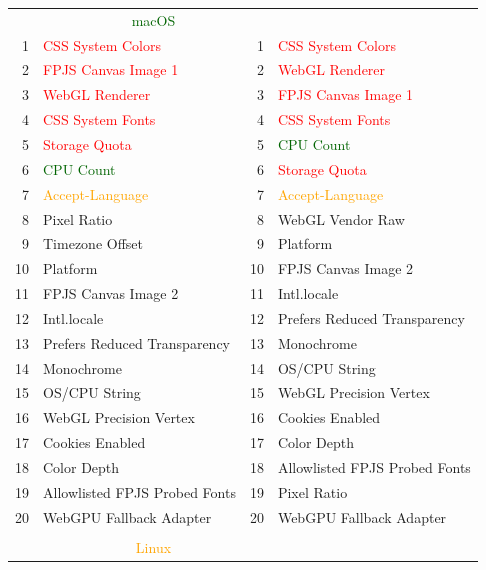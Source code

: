 \begin{table}[H]
\scriptsize
\centering
\begin{tabular}{r l | r l}
\Xhline{2\arrayrulewidth}
\multicolumn{2}{c|}{\textsf{\textcolor{red}{Windows}}} & \multicolumn{2}{c}{\textsf{\textcolor{darkgreen}{macOS}}} \\
\Xhline{2\arrayrulewidth}
1 & \textcolor{red}{CSS System Colors} & 1 & \textcolor{red}{CSS System Colors} \\
2 & \textcolor{red}{FPJS Canvas Image 1} & 2 & \textcolor{red}{WebGL Renderer} \\
3 & \textcolor{red}{WebGL Renderer} & 3 & \textcolor{red}{FPJS Canvas Image 1} \\
4 & \textcolor{red}{CSS System Fonts} & 4 & \textcolor{red}{CSS System Fonts} \\
5 & \textcolor{red}{Storage Quota} & 5 & \textcolor{darkgreen}{CPU Count} \\
6 & \textcolor{darkgreen}{CPU Count} & 6 & \textcolor{red}{Storage Quota} \\
7 & \textcolor{orange}{Accept-Language} & 7 & \textcolor{orange}{Accept-Language} \\
8 & Pixel Ratio & 8 & WebGL Vendor Raw \\
9 & Timezone Offset & 9 & Platform \\
10 & Platform & 10 & FPJS Canvas Image 2 \\
11 & FPJS Canvas Image 2 & 11 & Intl.locale \\
12 & Intl.locale & 12 & Prefers Reduced Transparency \\
13 & Prefers Reduced Transparency & 13 & Monochrome \\
14 & Monochrome & 14 & OS/CPU String \\
15 & OS/CPU String & 15 & WebGL Precision Vertex \\
16 & WebGL Precision Vertex & 16 & Cookies Enabled \\
17 & Cookies Enabled & 17 & Color Depth \\
18 & Color Depth & 18 & Allowlisted FPJS Probed Fonts \\
19 & Allowlisted FPJS Probed Fonts & 19 & Pixel Ratio \\
20 & WebGPU Fallback Adapter & 20 & WebGPU Fallback Adapter \\
\Xhline{2\arrayrulewidth}
 & & & \\
\Xhline{2\arrayrulewidth}
\multicolumn{2}{c|}{\textsf{\textcolor{blue}{Android}}} & \multicolumn{2}{c}{\textsf{\textcolor{orange}{Linux}}} \\

\end{tabular}
\end{table}
